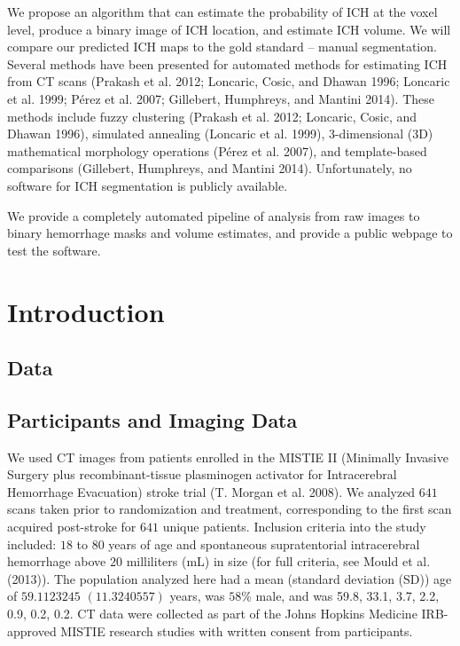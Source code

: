 \documentclass[]{elsarticle} %
\begin{document}
We propose an algorithm that can estimate the probability of ICH at the
voxel level, produce a binary image of ICH location, and estimate ICH
volume. We will compare our predicted ICH maps to the gold standard --
manual segmentation. Several methods have been presented for automated
methods for estimating ICH from CT scans (Prakash et al. 2012; Loncaric,
Cosic, and Dhawan 1996; Loncaric et al. 1999; Pérez et al. 2007;
Gillebert, Humphreys, and Mantini 2014). These methods include fuzzy
clustering (Prakash et al. 2012; Loncaric, Cosic, and Dhawan 1996),
simulated annealing (Loncaric et al. 1999), 3-dimensional (3D)
mathematical morphology operations (Pérez et al. 2007), and
template-based comparisons (Gillebert, Humphreys, and Mantini 2014).
Unfortunately, no software for ICH segmentation is publicly available.

We provide a completely automated pipeline of analysis from raw images
to binary hemorrhage masks and volume estimates, and provide a public
webpage to test the software.

\hypertarget{introduction-1}{%
\section{Introduction}\label{introduction-1}}

\hypertarget{data}{%
\subsection{Data}\label{data}}

\hypertarget{participants-and-imaging-data}{%
\subsection{Participants and Imaging
Data}\label{participants-and-imaging-data}}

We used CT images from patients enrolled in the MISTIE II (Minimally
Invasive Surgery plus recombinant-tissue plasminogen activator for
Intracerebral Hemorrhage Evacuation) stroke trial (T. Morgan et al.
2008). We analyzed \(641\) scans taken prior to randomization and
treatment, corresponding to the first scan acquired post-stroke for
\(641\) unique patients. Inclusion criteria into the study included:
\(18\) to \(80\) years of age and spontaneous supratentorial
intracerebral hemorrhage above \(20\) milliliters (mL) in size (for full
criteria, see Mould et al. (2013)). The population analyzed here had a
mean (standard deviation (SD)) age of \(59.1123245\) \((11.3240557)\)
years, was \(58\%\) male, and was 59.8, 33.1, 3.7, 2.2, 0.9, 0.2, 0.2.
CT data were collected as part of the Johns Hopkins Medicine
IRB-approved MISTIE research studies with written consent from
participants.
\end{document}
